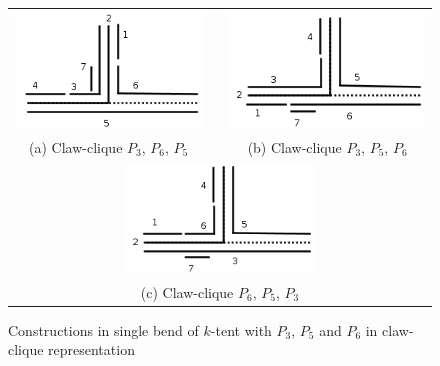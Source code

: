  \begin{figure}[htb]
 
  \centering
  \begin{tabular}{  c p{0.7cm} c}
    \includegraphics[width=5cm]{img/noClaw365.png} & &
    \includegraphics[width=5.2cm]{img/noClaw356.png}
    \\
    \footnotesize %
    (a)  \footnotesize Claw-clique $P_3$, $P_6$, $P_5$ && \footnotesize (b) Claw-clique $P_3$, $P_5$, $P_6$\\
    \multicolumn{3}{c}{\includegraphics[width=5cm]{img/noClaw653.png}  }
    \\
    \multicolumn{3}{c}{ \footnotesize (c) Claw-clique $P_6$, $P_5$, $P_3$ }
    \\
  \end{tabular}
 
 \caption{Constructions in single bend of $k$-tent with $P_3$, $P_5$ and $P_6$ in claw-clique representation }
\label{fig:noClaw365}
\end{figure}  
 